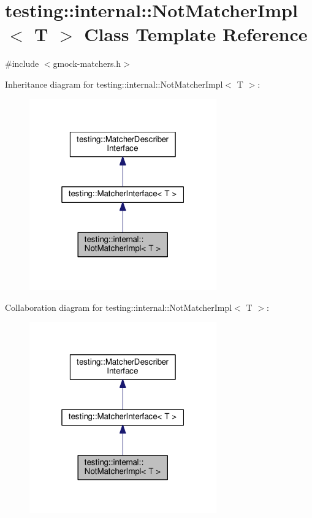\hypertarget{classtesting_1_1internal_1_1NotMatcherImpl}{}\section{testing\+:\+:internal\+:\+:Not\+Matcher\+Impl$<$ T $>$ Class Template Reference}
\label{classtesting_1_1internal_1_1NotMatcherImpl}


{\ttfamily \#include $<$gmock-\/matchers.\+h$>$}



Inheritance diagram for testing\+:\+:internal\+:\+:Not\+Matcher\+Impl$<$ T $>$\+:\nopagebreak
\begin{figure}[H]
\begin{center}
\leavevmode
\includegraphics[width=229pt]{classtesting_1_1internal_1_1NotMatcherImpl__inherit__graph}
\end{center}
\end{figure}


Collaboration diagram for testing\+:\+:internal\+:\+:Not\+Matcher\+Impl$<$ T $>$\+:\nopagebreak
\begin{figure}[H]
\begin{center}
\leavevmode
\includegraphics[width=229pt]{classtesting_1_1internal_1_1NotMatcherImpl__coll__graph}
\end{center}
\end{figure}
